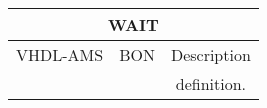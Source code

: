 \begin{center}
\begin{tabular}{ c  c  c }
\multicolumn{3}{c}{\textbf{WAIT}}\\ 
\hline \hline
VHDL-AMS & BON & Description \\ 
\hline \hline

\begin{minipage}[c]{2.4cm} 
\centering
\smallskip \smallskip 

\smallskip \smallskip
\end{minipage}  
&
\begin{minipage}[c]{4.6cm}
\centering 
\smallskip \smallskip

\smallskip \smallskip
\end{minipage}  
& 
\begin{minipage}[c]{6cm}  
\smallskip \smallskip
definition.
\smallskip \smallskip
\end{minipage}\\ 
\end{tabular}
\end{center}

